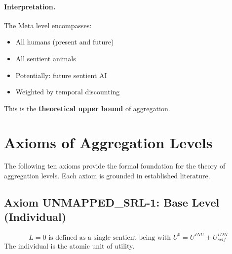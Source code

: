 \paragraph{Interpretation.}
The Meta level encompasses:
\begin{itemize}
\item All humans (present and future)
\item All sentient animals
\item Potentially: future sentient AI
\item Weighted by temporal discounting
\end{itemize}

This is the \textbf{theoretical upper bound} of aggregation.


\section{Axioms of Aggregation Levels}
\label{sec:aaa-axioms}

The following ten axioms provide the formal foundation for the theory of 
aggregation levels. Each axiom is grounded in established literature.

\subsection{Axiom UNMAPPED_SRL-1: Base Level (Individual)}

\begin{tcolorbox}[colback=gray!5!white, colframe=gray!75!black, title=Axiom UNMAPPED_SRL-1: Base Level]
\begin{equation}
\boxed{
L = 0 \text{ is defined as a single sentient being with } U^0 = U^{INU} + U^{IDN}_{self}
}
\end{equation}
The individual is the atomic unit of utility.
\end{tcolorbox}


